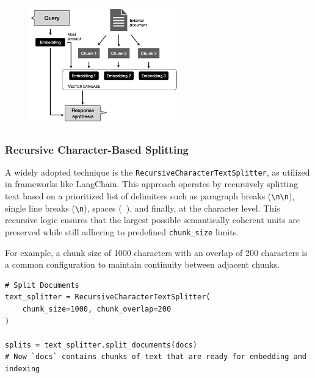 \documentclass[twocolumn, 10pt]{article}
\begin{document}
\begin{figure}[H]
    \centering
    \includegraphics[width=\linewidth]{secondimage.jpg}
    \caption{}
    \label{fig:indexing-process}
\end{figure}


\subsubsection{Recursive Character-Based Splitting}

A widely adopted technique is the \texttt{RecursiveCharacterTextSplitter}, as utilized in frameworks like LangChain. This approach operates by recursively splitting text based on a prioritized list of delimiters such as paragraph breaks (\texttt{\textbackslash n\textbackslash n}), single line breaks (\texttt{\textbackslash n}), spaces (\texttt{ }), and finally, at the character level. This recursive logic ensures that the largest possible semantically coherent units are preserved while still adhering to predefined \texttt{chunk\_size} limits. 

For example, a chunk size of 1000 characters with an overlap of 200 characters is a common configuration to maintain continuity between adjacent chunks.

\begin{lstlisting}[style=mypython]
# Split Documents
text_splitter = RecursiveCharacterTextSplitter(
    chunk_size=1000, chunk_overlap=200
)

splits = text_splitter.split_documents(docs)
# Now `docs` contains chunks of text that are ready for embedding and indexing
\end{lstlisting}
\end{document}
